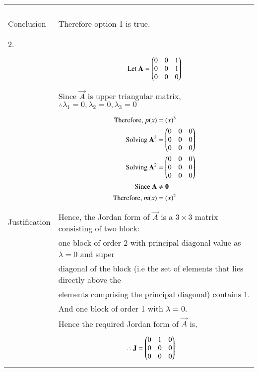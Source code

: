 \documentclass[journal,12pt]{IEEEtran}
\begin{document}
\begin{longtable}{|l|l|}
{\begin{align*}
\end{align*}}\\
&\\
\hline
&\\
Conclusion&Therefore option 1 is true.\\
&\\
\hline
\pagebreak
\hline
&\\
2.&\\
&\parbox{6cm}{\begin{align*}
    \mbox{Let }\mathbf{A}&=\begin{pmatrix}0&0&1\\0&0&1\\0&0&0\end{pmatrix}\\
\end{align*}}\\
&Since $\vec{A}$ is upper triangular matrix, $\therefore \lambda_{1}=0,\lambda_{2}=0,\lambda_{3}=0$ \\
&\parbox{6cm}{\begin{align*}
    \mbox{Therefore, }p(x)&=(x)^3\\
    \mbox{Solving }\mathbf{A}^3&=\begin{pmatrix}0&0&0\\0&0&0\\0&0&0\end{pmatrix}\\
    \mbox{Solving }\mathbf{A}^2&=\begin{pmatrix}0&0&0\\0&0&0\\0&0&0\end{pmatrix}\\
    \mbox{Since }\mathbf{A}&\neq \mathbf{0}\\
    \mbox{Therefore, }m(x)&=(x)^2\\
    \end{align*}}\\
Justification&Hence, the Jordan form of $\vec{A}$ is a $3 \times 3$ matrix consisting of two block:\\
&one block of order 2 with principal diagonal value as $\lambda = 0$ and super\\
&diagonal of the block (i.e the set of elements that lies directly above the\\
&elements comprising the principal diagonal) contains 1.\\
&And one block of order 1 with $\lambda=0$.\\
&Hence the required Jordan form of $\vec{A}$ is,\\
&\parbox{6cm}{\begin{align*}
    \therefore \mathbf{J}&=\begin{pmatrix}0&1&0\\0&0&0\\0&0&0\end{pmatrix}
\end{align*}}\\

\end{longtable}
\end{document}

